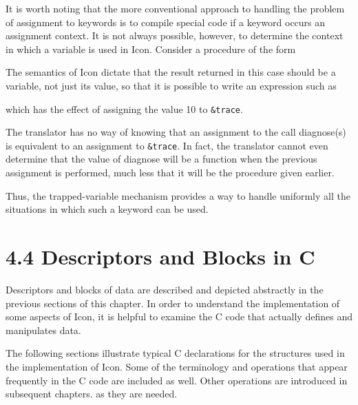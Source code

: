 It is worth noting that the more conventional approach to handling the
problem of assignment to keywords is to compile special code if a
keyword occurs an assignment context. It is not always possible,
however, to determine the context in which a variable is used in
Icon. Consider a procedure of the form


The semantics of Icon dictate that the result returned in this case
should be a variable, not just its value, so that it is possible to
write an expression such as


\noindent
which has the effect of assigning the value 10 to \texttt{\&trace}.

The translator has no way of knowing that an assignment to the call
diagnose(s) is equivalent to an assignment to \texttt{\&trace}. In
fact, the translator cannot even determine that the value of diagnose
will be a function when the previous assignment is performed, much
less that it will be the procedure given earlier.

Thus, the trapped-variable mechanism provides a way to handle
uniformly all the situations in which such a keyword can be used.

\section[4.4 Descriptors and Blocks in C]{4.4 Descriptors and Blocks in C}

Descriptors and blocks of data are described and depicted abstractly
in the previous sections of this chapter. In order to understand the
implementation of some aspects of Icon, it is helpful to examine the C
code that actually defines and manipulates data.

The following sections illustrate typical C declarations for the
structures used in the implementation of Icon. Some of the terminology
and operations that appear frequently in the C code are included as
well. Other operations are introduced in subsequent chapters. as they
are needed.

